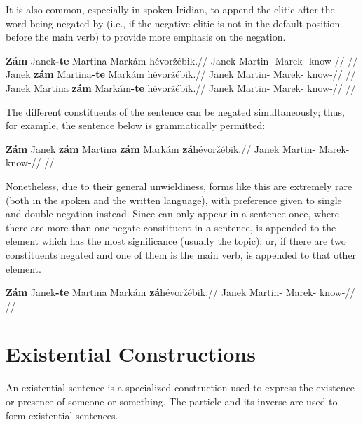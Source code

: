 It is also common, especially in spoken Iridian, to append the clitic 
after the word being negated by  (i.e., if the negative clitic is not
in the default position before the main verb) to provide more emphasis on the
negation.

\pex
\a
\begingl
    \gla \textbf{Z\'am} Janek\textbf{-te} Martina Mark\'am h\'evor\v{z}\'ebik.//
    \glb {} Janek Martin- Marek- know-//
    \glft {}//
\endgl
\a
\begingl
    \gla Janek \textbf{z\'am} Martina\textbf{-te} Mark\'am h\'evor\v{z}\'ebik.//
    \glb Janek  Martin- Marek- know-//
    \glft {}//
\endgl
\a
\begingl
    \gla Janek Martina \textbf{z\'am} Mark\'am\textbf{-te} h\'evor\v{z}\'ebik.//
    \glb Janek Martin-  Marek- know-//
    \glft {}//
\endgl
\xe

The different constituents of the sentence can be negated simultaneously; thus,
for example, the sentence below is grammatically permitted:

\pex
\begingl
    \gla \textbf{Z\'am} Janek \textbf{z\'am} Martina \textbf{z\'am} Mark\'am \textbf{z\'a}h\'evor\v{z}\'ebik.//
    \glb {} Janek  Martin-  Marek- know-//
    \glft {}//
\endgl
\xe

Nonetheless, due to their general unwieldiness, forms like this are extremely
rare (both in the spoken and the written language), with preference given to
single and double negation instead. Since  can only appear in a
sentence once, where there are more than one negate constituent in a sentence,
 is appended to the element which has the most significance (usually
the topic); or, if there are two constituents negated and one of them is the
main verb,  is appended to that other element.

\pex
\begingl
    \gla \textbf{Z\'am} Janek\textbf{-te} Martina Mark\'am \textbf{z\'a}h\'evor\v{z}\'ebik.//
    \glb {} Janek Martin- Marek- know-//
    \glft {}//
\endgl
\xe


\section{Existential Constructions}
\label{sec:exst}
An existential sentence is a specialized construction used to express the existence or presence of someone or something. The particle  and its inverse  are used to form existential sentences.

